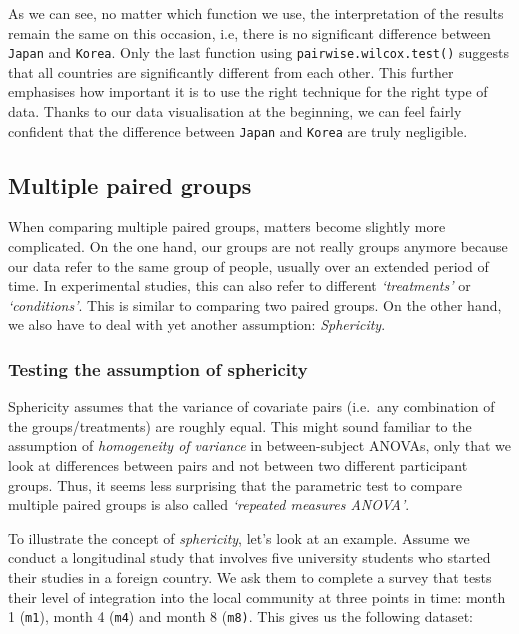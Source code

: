 \documentclass[
  letterpaper,
]{krantz}
\begin{document}
As we can see, no matter which function we use, the interpretation of
the results remain the same on this occasion, i.e, there is no
significant difference between \texttt{Japan} and \texttt{Korea}. Only
the last function using \texttt{pairwise.wilcox.test()} suggests that
all countries are significantly different from each other. This further
emphasises how important it is to use the right technique for the right
type of data. Thanks to our data visualisation at the beginning, we can
feel fairly confident that the difference between \texttt{Japan} and
\texttt{Korea} are truly negligible.

\subsection{Multiple paired groups}\label{sec-multiple-paired-groups}

When comparing multiple paired groups, matters become slightly more
complicated. On the one hand, our groups are not really groups anymore
because our data refer to the same group of people, usually over an
extended period of time. In experimental studies, this can also refer to
different \emph{`treatments'} or \emph{`conditions'}. This is similar to
comparing two paired groups. On the other hand, we also have to deal
with yet another assumption: \emph{Sphericity}.

\subsubsection{Testing the assumption of
sphericity}\label{sec-sphericity}

Sphericity assumes that the variance of covariate pairs (i.e.~any
combination of the groups/treatments) are roughly equal. This might
sound familiar to the assumption of \emph{homogeneity of variance} in
between-subject ANOVAs, only that we look at differences between pairs
and not between two different participant groups. Thus, it seems less
surprising that the parametric test to compare multiple paired groups is
also called \emph{`repeated measures ANOVA'}.

To illustrate the concept of \emph{sphericity}, let's look at an
example. Assume we conduct a longitudinal study that involves five
university students who started their studies in a foreign country. We
ask them to complete a survey that tests their level of integration into
the local community at three points in time: month 1 (\texttt{m1}),
month 4 (\texttt{m4}) and month 8 (\texttt{m8)}. This gives us the
following dataset:
\end{document}
